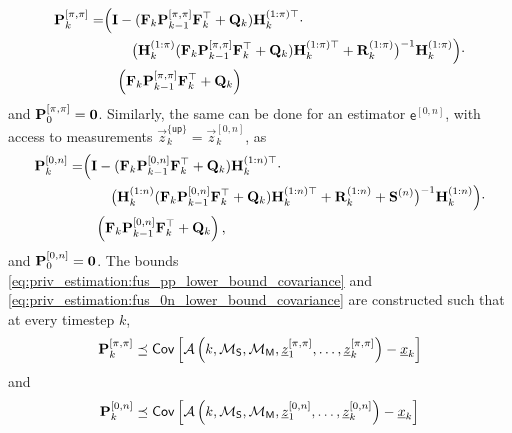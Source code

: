 \begin{equation}\label{eq:priv_estimation:fus_pp_lower_bound_covariance}
    \begin{split}
        {\ensuremath{{\mathbf{P}}}}_k^{[\pi,\pi]} =& \Bigl( {{\mathbf{I}}} - ({{\mathbf{F}}}_k{{\mathbf{P}}}_{k-1}^{[\pi,\pi]}{{\mathbf{F}}}_k^\top + {{\mathbf{Q}}}_k){{\mathbf{H}}}_k^{(1:\pi)\top} \cdot \\
        &\qquad\bigl({{\mathbf{H}}}_k^{(1:\pi)}({{\mathbf{F}}}_k{{\mathbf{P}}}_{k-1}^{[\pi,\pi]}{{\mathbf{F}}}_k^\top + {{\mathbf{Q}}}_k){{\mathbf{H}}}_k^{(1:\pi)\top}+ {{\mathbf{R}}}_k^{(1:\pi)}\bigr)^{-1}{{\mathbf{H}}}_k^{(1:\pi)}\Bigr)\cdot\\
        &\quad\Bigl({{\mathbf{F}}}_k{{\mathbf{P}}}_{k-1}^{[\pi,\pi]}{{\mathbf{F}}}_k^\top + {{\mathbf{Q}}}_k\Bigr)
    \end{split}
\end{equation}
and ${{\mathbf{P}}}_0^{[\pi,\pi]}={{\mathbf{0}}}$. Similarly, the same can be done for an estimator $\mathsf{e}^{[0,n]}$, with access to measurements $\vec{z}_k^{\{\mathsf{up}\}}=\vec{z}_k^{[0,n]}$, as
\begin{equation}\label{eq:priv_estimation:fus_0n_lower_bound_covariance}
    \begin{split}
        {\ensuremath{{\mathbf{P}}}}_k^{[0,n]} =& \Bigl( {{\mathbf{I}}} - ({{\mathbf{F}}}_k{{\mathbf{P}}}_{k-1}^{[0,n]}{{\mathbf{F}}}_k^\top + {{\mathbf{Q}}}_k){{\mathbf{H}}}_k^{(1:n)\top} \cdot \\
        &\qquad\bigl({{\mathbf{H}}}_k^{(1:n)}({{\mathbf{F}}}_k{{\mathbf{P}}}_{k-1}^{[0,n]}{{\mathbf{F}}}_k^\top + {{\mathbf{Q}}}_k){{\mathbf{H}}}_k^{(1:n)\top}+ {{\mathbf{R}}}_k^{(1:n)} + {{\mathbf{S}}}^{(n)}\bigr)^{-1}{{\mathbf{H}}}_k^{(1:n)}\Bigr)\cdot\\
        &\quad\Bigl({{\mathbf{F}}}_k{{\mathbf{P}}}_{k-1}^{[0,n]}{{\mathbf{F}}}_k^\top + {{\mathbf{Q}}}_k\Bigr)\,,
    \end{split}
\end{equation}
and ${{\mathbf{P}}}_0^{[0,n]}={{\mathbf{0}}}$. The bounds \eqref{eq:priv_estimation:fus_pp_lower_bound_covariance} and \eqref{eq:priv_estimation:fus_0n_lower_bound_covariance} are constructed such that at every timestep $k$,
\begin{equation}\label{eq:priv_estimation:fus_pp_cov_bound}
    {\ensuremath{{\mathbf{P}}}}_k^{[\pi,\pi]} \preceq\mathsf{Cov}\left[\mathcal{A}\left(k,\mathcal{M}_{\mathsf{S}},\mathcal{M}_{\mathsf{M}},{\underline{z}}_1^{[\pi,\pi]},\dots,{\underline{z}}_k^{[\pi,\pi]}\right) - {\underline{x}}_k\right]
\end{equation}
and
\begin{equation}\label{eq:priv_estimation:fus_0n_cov_bound}
    {\ensuremath{{\mathbf{P}}}}_k^{[0,n]} \preceq \mathsf{Cov}\left[\mathcal{A}\left(k,\mathcal{M}_{\mathsf{S}},\mathcal{M}_{\mathsf{M}},{\underline{z}}_1^{[0,n]},\dots,{\underline{z}}_k^{[0,n]}\right) - {\underline{x}}_k\right]
\end{equation}
